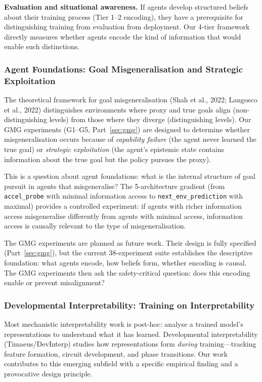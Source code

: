 \documentclass[11pt,a4paper]{article}
\theoremstyle{remark}
\begin{document}
\textbf{Evaluation and situational awareness.} If agents develop structured beliefs about their training process (Tier 1--2 encoding), they have a prerequisite for distinguishing training from evaluation from deployment. Our 4-tier framework directly measures whether agents encode the kind of information that would enable such distinctions.

\subsubsection{Agent Foundations: Goal Misgeneralisation and Strategic Exploitation}

The theoretical framework for goal misgeneralisation (Shah et al., 2022; Langosco et al., 2022) distinguishes environments where proxy and true goals align (non-distinguishing levels) from those where they diverge (distinguishing levels). Our GMG experiments (G1--G5, Part~\ref{sec:gmg}) are designed to determine whether misgeneralisation occurs because of \textit{capability failure} (the agent never learned the true goal) or \textit{strategic exploitation} (the agent's epistemic state contains information about the true goal but the policy pursues the proxy).

This is a question about agent foundations: what is the internal structure of goal pursuit in agents that misgeneralise? The 5-architecture gradient (from \texttt{accel\_probe} with minimal information access to \texttt{next\_env\_prediction} with maximal) provides a controlled experiment: if agents with richer information access misgeneralise differently from agents with minimal access, information access is causally relevant to the type of misgeneralisation.

The GMG experiments are planned as future work. Their design is fully specified (Part~\ref{sec:gmg}), but the current 38-experiment suite establishes the descriptive foundation: what agents encode, how beliefs form, whether encoding is causal. The GMG experiments then ask the safety-critical question: does this encoding enable or prevent misalignment?

\subsubsection{Developmental Interpretability: Training on Interpretability}

Most mechanistic interpretability work is post-hoc: analyse a trained model's representations to understand what it has learned. Developmental interpretability (Timaeus/DevInterp) studies how representations form \textit{during} training---tracking feature formation, circuit development, and phase transitions. Our work contributes to this emerging subfield with a specific empirical finding and a provocative design principle.
\end{document}
